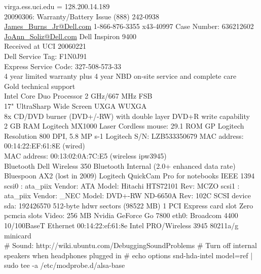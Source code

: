 \documentclass[12pt,twoside]{article}
\begin{document}
virga.ess.uci.edu = 128.200.14.189 \\
20090306: Warranty/Battery Issue (888) 242-0938 \\
\url{James_Burns_Jr@Dell.com}
1-866-876-3355 x43-40997
Case Number: 636212602
\url{JoAnn_Soliz@Dell.com}
Dell Inspiron 9400 \\
Received at UCI 20060221 \\
Dell Service Tag: F1N0J91 \\
Express Service Code: 327-508-573-33 \\
4 year limited warranty plus 4 year NBD on-site service and complete care\\
Gold technical support\\
Intel Core Duo Processor 2 GHz/667 MHz FSB\\
17" UltraSharp Wide Screen UXGA WUXGA\\
8x CD/DVD burner (DVD+/-RW) with double layer DVD+R write capability\\
2 GB RAM
Logitech MX1000 Laser Cordless mouse: 29.1 ROM GP
Logitech Resolution 800 DPI, 5.8 MP s-1
Logitech S/N: LZB533350679
MAC address: 00:14:22:EF:61:8E (wired) \\
MAC address: 00:13:02:0A:7C:E5 (wireless ipw3945) \\
Bluetooth Dell Wireless 350 Bluetooth Internal (2.0+ enhanced data rate)\\
Bluespoon AX2 (lost in 2009)
Logitech QuickCam Pro for notebooks
IEEE 1394 \\
scsi0 : ata\_piix Vendor: ATA Model: Hitachi HTS72101  Rev: MCZO
scsi1 : ata\_piix Vendor: \_NEC Model: DVD+-RW ND-6650A  Rev: 102C
SCSI device sda: 192426570 512-byte hdwr sectors (98522 MB)
1 PCI Express card slot
Zero pcmcia slots
Video: 256 MB Nvidia GeForce Go 7800
eth0: Broadcom 4400 10/100BaseT Ethernet 00:14:22:ef:61:8e
Intel PRO/Wireless 3945 80211a/g minicard\\
\# Sound: http://wiki.ubuntu.com/DebuggingSoundProblems 
\# Turn off internal speakers when headphones plugged in
\# echo options snd-hda-intel model=ref | sudo tee -a /etc/modprobe.d/alsa-base
\end{document}

